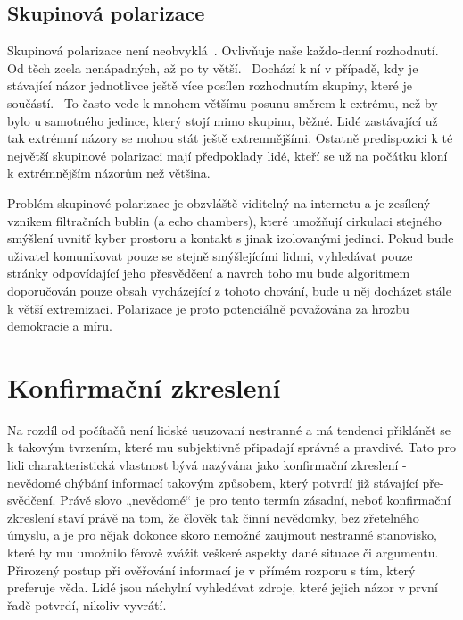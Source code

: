     \setlength\parskip{0mm}

\subsection{Skupinová polarizace}
\label{sec:skupinova-polarizace}
    Skupinová polarizace není neobvyklá~\citep{sunstein1999law}. Ovlivňuje naše každo-denní rozhodnutí. Od těch zcela nenápadných, až po ty větší.~\citep{sunstein2009going} Dochází k ní v případě, kdy je stávající názor jednotlivce ještě více posílen rozhodnutím skupiny, které je součástí.~\citep{Isenberg1986GroupPA} To často vede k mnohem většímu posunu směrem k extrému, než by bylo u samotného jedince, který stojí mimo skupinu, běžné. Lidé zastávající už tak extrémní názory se mohou stát ještě extremnějšími. Ostatně predispozici k té největší skupinové polarizaci mají předpoklady lidé, kteří se už na počátku kloní k extrémnějším názorům než většina.~\citep{sunstein1999law}  
    
    Problém skupinové polarizace je obzvláště viditelný na internetu a je zesílený vznikem filtračních bublin (a echo chambers), které umožňují cirkulaci stejného smýšlení uvnitř kyber prostoru a kontakt s jinak izolovanými jedinci. Pokud bude uživatel komunikovat pouze se stejně smýšlejícími lidmi, vyhledávat pouze stránky odpovídající jeho přesvědčení a navrch toho mu bude algoritmem doporučován pouze obsah vycházející z tohoto chování, bude u něj docházet stále k větší extremizaci. Polarizace je proto potenciálně považována za hrozbu demokracie a míru.~\citep{Sunstein07}


\section{Konfirmační zkreslení}
\label{sec:konfirmacni-zkresleni}
   Na rozdíl od počítačů není lidské usuzovaní nestranné a má tendenci přiklánět se k takovým tvrzením, které mu subjektivně připadají správné a pravdivé. Tato pro lidi charakteristická vlastnost bývá nazývána jako konfirmační zkreslení - nevědomé ohýbání informací takovým způsobem, který potvrdí již stávající pře-svědčení. Právě slovo „nevědomé“ je pro tento termín zásadní, neboť konfirmační zkreslení staví právě na tom, že člověk tak činní nevědomky, bez zřetelného úmyslu, a je pro nějak dokonce skoro nemožné zaujmout nestranné stanovisko, které by mu umožnilo férově zvážit veškeré aspekty dané situace či argumentu. Přirozený postup při ověřování informací je v přímém rozporu s tím, který preferuje věda. Lidé jsou náchylní vyhledávat zdroje, které jejich názor v první řadě potvrdí, nikoliv vyvrátí.~\citep{Nickerson1998ConfirmationBA} 
    
